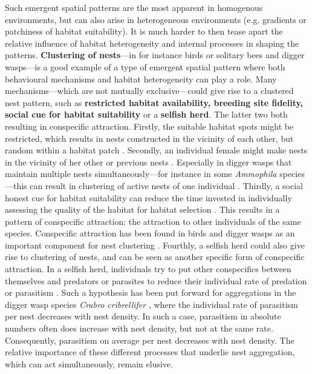 \documentclass[10pt, twoside]{book} %
\begin{document}
	Such emergent spatial patterns are the most apparent in homogenous environments, but can also arise in heterogeneous environments (e.g. gradients or patchiness of habitat suitability). It is much harder to then tease apart the relative influence of habitat heterogeneity and internal processes in shaping the patterns. \textbf{Clustering of nests}---in for instance birds or solitary bees and digger wasps---is a good example of a type of emergent spatial pattern where both behavioural mechanisms and habitat heterogeneity can play a role. Many mechanisms---which are not mutually exclusive---could give rise to a clustered nest pattern, such as \textbf{restricted habitat availability, breeding site fidelity, social cue for habitat suitability} or a\textbf{ selfish herd}. The latter two both resulting in conspecific attraction. Firstly, the suitable habitat spots might be restricted, which results in nests constructed in the vicinity of each other, but random within a habitat patch \citep[e.g. in shorebirds][]{swift2017}. Secondly, an individual female might make nests in the vicinity of her other or previous nests \citep{hoi2012, asis2014}. Especially in digger wasps that maintain multiple nests simultaneously---for instance in some \textit{Ammophila} species---this can result in clustering of active nests of one individual \citep{baerends1938}. Thirdly, a social honest cue for habitat suitability can reduce the time invested in individually assessing the quality of the habitat for habitat selection \citep{dall2005, buxton2020}. This results in a pattern of conspecific attraction: the attraction to other individuals of the same species. Conspecific attraction has been found in birds and digger wasps as an important component for nest clustering \citep{brown2000, polidori2008, melles2009, asis2014}. Fourthly, a selfish herd could also give rise to clustering of nests, and can be seen as another specific form of conspecific attraction. In a selfish herd, individuals try to put other conspecifics between themselves and predators or parasites to reduce their individual rate of predation or parasitism \citep{mooring1992}. Such a hypothesis has been put forward for aggregations in the digger wasp species \textit{Crabro cribrellifer} \citep{wcislo1984, larsson1986}, where the individual rate of parasitism per nest decreases with nest density. In such a case, parasitism in absolute numbers often does increase with nest density, but not at the same rate. Consequently, parasitism on average per nest decreases with nest density. The relative importance of these different processes that underlie nest aggregation, which can act simultaneously, remain elusive.\\
	
\end{document}

